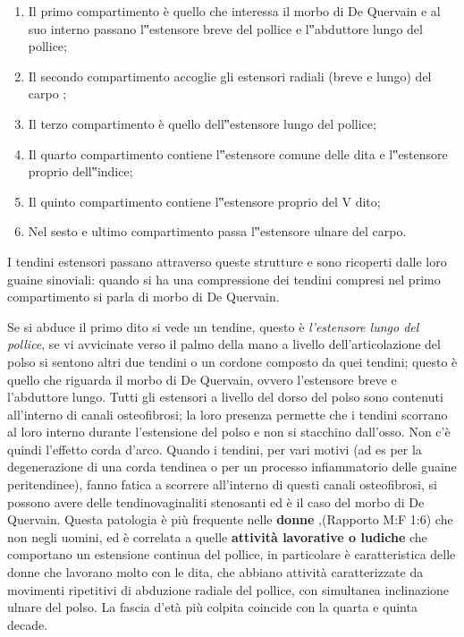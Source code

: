 \documentclass[]{article}
\begin{document}
\begin{enumerate}
\def\labelenumi{\arabic{enumi}.}
\item
  Il primo compartimento è quello che interessa il morbo di De Quervain
  e al suo interno passano l‟estensore breve del pollice e l‟abduttore
  lungo del pollice;
\item
  Il secondo compartimento accoglie gli estensori radiali (breve e
  lungo) del carpo ;
\item
  Il terzo compartimento è quello dell‟estensore lungo del pollice;
\item
  Il quarto compartimento contiene l‟estensore comune delle dita e
  l‟estensore proprio dell‟indice;
\item
  Il quinto compartimento contiene l‟estensore proprio del V dito;
\item
  Nel sesto e ultimo compartimento passa l‟estensore ulnare del carpo.
\end{enumerate}

I tendini estensori passano attraverso queste strutture e sono ricoperti
dalle loro guaine sinoviali: quando si ha una compressione dei tendini
compresi nel primo compartimento si parla di morbo di De Quervain.

Se si abduce il primo dito si vede un tendine, questo è
\emph{l'estensore lungo del pollice}, se vi avvicinate verso il palmo
della mano a livello dell'articolazione del polso si sentono altri due
tendini o un cordone composto da quei tendini; questo è quello che
riguarda il morbo di De Quervain, ovvero l'estensore breve e l'abduttore
lungo. Tutti gli estensori a livello del dorso del polso sono contenuti
all'interno di canali osteofibrosi; la loro presenza permette che i
tendini scorrano al loro interno durante l'estensione del polso e non si
stacchino dall'osso. Non c'è quindi l'effetto corda d'arco. Quando i
tendini, per vari motivi (ad es per la degenerazione di una corda
tendinea o per un processo infiammatorio delle guaine peritendinee),
fanno fatica a scorrere all'interno di questi canali osteofibrosi, si
possono avere delle tendinovaginaliti stenosanti ed è il caso del morbo
di De Quervain. Questa patologia è più frequente nelle \textbf{donne}
,(Rapporto M:F 1:6) che non negli uomini, ed è correlata a quelle
\textbf{attività lavorative o ludiche} che comportano un estensione
continua del pollice, in particolare è caratteristica delle donne che
lavorano molto con le dita, che abbiano attività caratterizzate da
movimenti ripetitivi di abduzione radiale del pollice, con simultanea
inclinazione ulnare del polso. La fascia d'età più colpita coincide con
la quarta e quinta decade.
\end{document}
